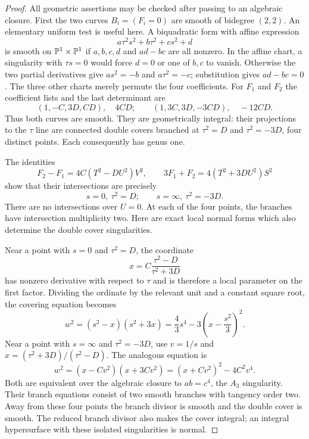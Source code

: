 \documentclass[11pt,a4paper]{article}
\begin{document}
\begin{proof}
All geometric assertions may be checked after passing to an algebraic
closure. First the two curves $B_i=(F_i=0)$ are smooth of bidegree
$(2,2)$. An elementary uniform test is useful here. A biquadratic
form with affine expression
\[
                 a\tau^2s^2+b\tau^2+cs^2+d
\]
is smooth on $\mathbb P^1\times\mathbb P^1$ if $a,b,c,d$ and $ad-bc$ are
all nonzero. In the affine chart, a singularity with $\tau s=0$
would force $d=0$ or one of $b,c$ to vanish. Otherwise the two
partial derivatives give $as^2=-b$ and $a\tau^2=-c$; substitution
gives $ad-bc=0$. The three other charts merely permute the four
coefficients. For $F_1$ and $F_2$ the coefficient lists and the
last determinant are
\[
 (1,-C,3D,CD),\quad 4CD;\qquad
 (1,3C,3D,-3CD),\quad -12CD.
\]
Thus both curves are smooth. They are geometrically integral:
their projections to the $\tau$ line are connected double covers
branched at $\tau^2=D$ and $\tau^2=-3D$, four distinct points.
Each consequently has genus one.

The identities
\begin{equation}\label{eq:intersections}
 F_2-F_1=4C(T^2-DU^2)V^2,\qquad
 3F_1+F_2=4(T^2+3DU^2)S^2
\end{equation}
show that their intersections are precisely
\begin{equation}\label{eq:four}
 s=0,\ \tau^2=D;\qquad
 s=\infty,\ \tau^2=-3D.
\end{equation}
There are no intersections over $U=0$. At each of the four
points, the branches have intersection multiplicity two.
Here are exact local normal forms which also determine the double
cover singularities.

Near a point with $s=0$ and $\tau^2=D$, the coordinate
\[
                    x=C\frac{\tau^2-D}{\tau^2+3D}
\]
has nonzero derivative with respect to $\tau$ and is therefore
a local parameter on the first factor. Dividing the ordinate by
the relevant unit and a constant square root, the covering equation
becomes
\begin{equation}\label{eq:normalzero}
 w^2=(s^2-x)(s^2+3x)
     =\frac43s^4-3\left(x-\frac{s^2}{3}\right)^2.
\end{equation}
Near a point with $s=\infty$ and $\tau^2=-3D$, use
$v=1/s$ and $x=(\tau^2+3D)/(\tau^2-D)$. The analogous equation is
\begin{equation}\label{eq:normalinfinity}
 w^2=(x-Cv^2)(x+3Cv^2)=(x+Cv^2)^2-4C^2v^4.
\end{equation}
Both are equivalent over the algebraic closure to
$ab=c^4$, the $A_3$ singularity. Their branch equations consist
of two smooth branches with tangency order two. Away from these
four points the branch divisor is smooth and the double cover is
smooth. The reduced branch divisor also makes the cover integral;
an integral hypersurface with these isolated singularities is normal.


\end{proof}
\end{document}
